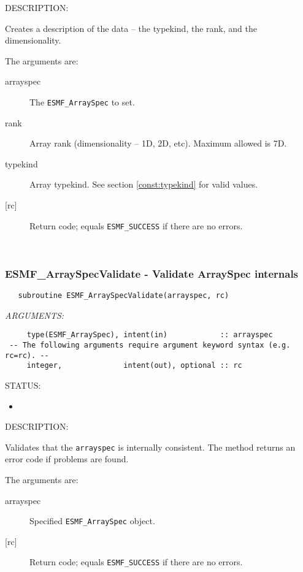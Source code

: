 {\sf DESCRIPTION:\\ }


     Creates a description of the data -- the typekind, the rank,
     and the dimensionality.
  
     The arguments are:
     \begin{description}
     \item[arrayspec]
       The {\tt ESMF\_ArraySpec} to set.
     \item[rank]
       Array rank (dimensionality -- 1D, 2D, etc). Maximum allowed is 7D.
     \item[typekind]
       Array typekind.  See section \ref{const:typekind} for valid values.
     \item[{[rc]}]
       Return code; equals {\tt ESMF\_SUCCESS} if there are no errors.
     \end{description}
   
 
\mbox{}\hrulefill\ 
 
\subsubsection [ESMF\_ArraySpecValidate] {ESMF\_ArraySpecValidate - Validate ArraySpec internals}


 
\begin{verbatim}   subroutine ESMF_ArraySpecValidate(arrayspec, rc)\end{verbatim}{\em ARGUMENTS:}
\begin{verbatim}     type(ESMF_ArraySpec), intent(in)            :: arrayspec
 -- The following arguments require argument keyword syntax (e.g. rc=rc). --
     integer,              intent(out), optional :: rc  \end{verbatim}
{\sf STATUS:}
   \begin{itemize}
   \item{}
   \end{itemize}
  
{\sf DESCRIPTION:\\ }


     Validates that the {\tt arrayspec} is internally consistent.
     The method returns an error code if problems are found.  
  
     The arguments are:
     \begin{description}
     \item[arrayspec] 
       Specified {\tt ESMF\_ArraySpec} object.
     \item[{[rc]}] 
       Return code; equals {\tt ESMF\_SUCCESS} if there are no errors.
     \end{description}
  
\setlength{\parskip}{\oldparskip}
\setlength{\parindent}{\oldparindent}
\setlength{\baselineskip}{\oldbaselineskip}
